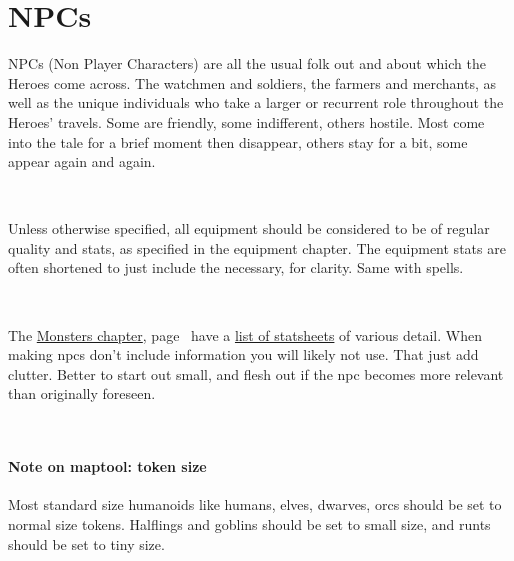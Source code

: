 

\cleardoublepage

\raggedbottom

\chapter*{NPCs}

NPCs (Non Player Characters) are all the usual folk out and about which the Heroes come across. The watchmen and soldiers, the farmers and merchants, as well as the unique individuals who take a larger or recurrent role throughout the Heroes' travels. Some are friendly, some indifferent, others hostile. Most come into the tale for a brief moment then disappear, others stay for a bit, some appear again and again.

\

Unless otherwise specified, all equipment should be considered to be of regular quality and stats, as specified in the equipment chapter. The equipment stats are often shortened to just include the necessary, for clarity. Same with spells.

\

The \hyperref[cpt:monsters]{Monsters chapter}, page~\pageref{cpt:monsters} have a \hyperref[sec:statsheets]{list of statsheets} of various detail. When making npcs don't include information you will likely not use. That just add clutter. Better to start out small, and flesh out if the npc becomes more relevant than originally foreseen.

\

\subsubsection*{Note on maptool: token size}
Most standard size humanoids like humans, elves, dwarves, orcs should be set to  normal size tokens. Halflings and goblins should be set to small size, and runts should be set to tiny size.

\










